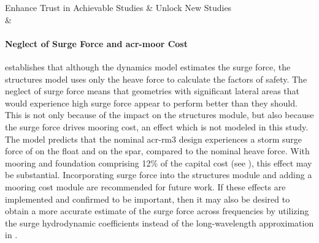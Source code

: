 \begin{table}[htbp]
\caption{Future model improvements}
    \label{tab:future-work}
Enhance Trust in Achievable Studies  & Unlock New Studies  \\ \hline
\modelTrustBuilders                & \modelStudyEnablers \\
    \endtabular
    \end{table}

\ifdefined\DISSERTATION
    \paragraph{Neglect of Surge Force and \gls{acr-moor} Cost}
     establishes that although the dynamics model estimates the surge force, the structures model uses only the heave force to calculate the factors of safety.
    The neglect of surge force means that geometries with significant lateral areas that would experience high surge force appear to perform better than they should.
    This is not only because of the impact on the structures module, but also because the surge force drives mooring cost, an effect which is not modeled in this study.
    The model predicts that the nominal \gls{acr-rm3} design experiences a storm surge force of \resultsAOR[surgeForceFloatNominal] on the float and \resultsAOR[surgeForceSparNominal] on the spar, compared to the \resultsAOR[heaveForceNominal] nominal heave force.
    With mooring and foundation comprising 12\% of the capital cost (see ), this effect may be substantial.
    Incorporating surge force into the structures module and adding a mooring cost module are recommended for future work.
    If these effects are implemented and confirmed to be important, then it may also be desired to obtain a more accurate estimate of the surge force across frequencies by utilizing the surge hydrodynamic coefficients instead of the long-wavelength approximation in . 
    
